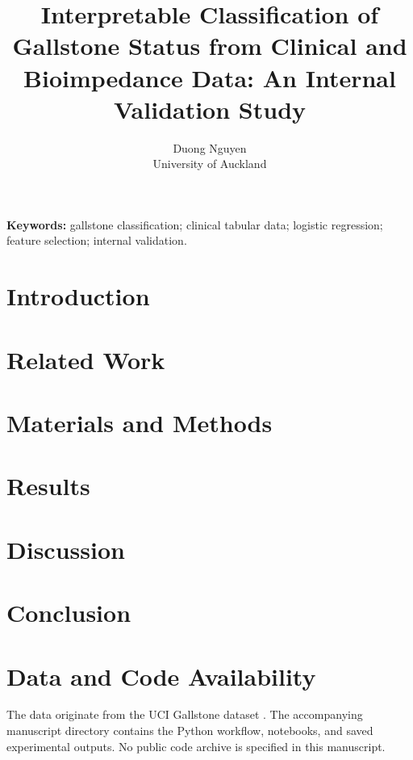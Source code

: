 \documentclass[11pt,a4paper]{article}
\title{Interpretable Classification of Gallstone Status from Clinical and Bioimpedance Data: An Internal Validation Study}
\author{Duong Nguyen\\University of Auckland}
\date{}
\begin{document}
\maketitle
\begin{abstract}

\end{abstract}
\noindent\textbf{Keywords:} gallstone classification; clinical tabular data; logistic regression; feature selection; internal validation.

\section{Introduction}\label{sec:introduction}


\section{Related Work}\label{sec:related-work}


\section{Materials and Methods}\label{sec:methods}


\section{Results}\label{sec:results}

\section{Discussion}\label{sec:discussion}


\section{Conclusion}\label{sec:conclusion}


\section*{Data and Code Availability}
The data originate from the UCI Gallstone dataset \parencite{uci2025gallstone}. The accompanying manuscript directory contains the Python workflow, notebooks, and saved experimental outputs. No public code archive is specified in this manuscript.


\printbibliography[title={References}]
\end{document}
